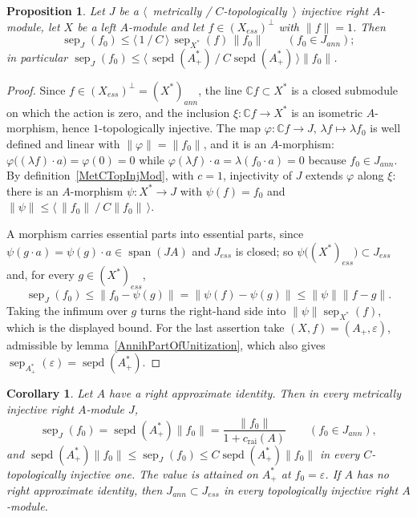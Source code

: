 \documentclass[11pt]{article}
\theoremstyle{plain}
\newtheorem{corollary}[theorem]{Corollary}
\newtheorem{proposition}[theorem]{Proposition}
\theoremstyle{definition}
\DeclareMathOperator{\sep}{sep}
\DeclareMathOperator{\sepd}{sepd}
\newcommand{\crai}{c_{\mathrm{rai}}}
\begin{document}
\begin{proposition}\label{SepOfAnnihVectorInInjMod}
Let $J$ be a $\langle$~metrically / $C$-topologically~$\rangle$ injective right
$A$-module, let $X$ be a left $A$-module and let $f\in{(X_{ess})}^\perp$ with
$\lVert f\rVert=1$. Then
\[
\sep_J(f_0)\leq\langle\,1\ /\ C\,\rangle\,\sep_{X^*}(f)\,\lVert f_0\rVert
\qquad(f_0\in J_{ann});
\]
in particular
$\sep_J(f_0)\leq\langle\,\sepd(A_+^*)\ /\ C\sepd(A_+^*)\,\rangle\lVert f_0\rVert$.
\end{proposition}

\begin{proof}
Since $f\in{(X_{ess})}^\perp={(X^*)}_{ann}$, the line
$\mathbb{C}f\subset X^*$ is a closed submodule on which the action is zero, and
the inclusion $\xi:\mathbb{C}f\to X^*$ is an isometric $A$-morphism, hence
$1$-topologically injective. The map
$\varphi:\mathbb{C}f\to J,\,\lambda f\mapsto\lambda f_0$ is well defined and
linear with $\lVert\varphi\rVert=\lVert f_0\rVert$, and it is an $A$-morphism:
$\varphi \bigl((\lambda f)\cdot a \bigr)=\varphi(0)=0$ while
$\varphi(\lambda f)\cdot a=\lambda(f_0\cdot a)=0$ because $f_0\in J_{ann}$. By
definition~\ref{MetCTopInjMod}, with $c=1$, injectivity of $J$ extends $\varphi$
along $\xi$: there is an $A$-morphism $\psi:X^*\to J$ with $\psi(f)=f_0$ and
$\lVert\psi\rVert\leq\langle\,\lVert f_0\rVert\ /\ C\lVert f_0\rVert\,\rangle$.

A morphism carries essential parts into essential parts, since
$\psi(g\cdot a)=\psi(g)\cdot a\in\operatorname{span}(JA)$ and $J_{ess}$ is
closed; so $\psi \bigl({(X^*)}_{ess} \bigr)\subset J_{ess}$ and, for every
$g\in{(X^*)}_{ess}$,
\[
\sep_J(f_0)\leq\lVert f_0-\psi(g)\rVert=\lVert\psi(f)-\psi(g)\rVert
\leq\lVert\psi\rVert\lVert f-g\rVert .
\]
Taking the infimum over $g$ turns the right-hand side into
$\lVert\psi\rVert\sep_{X^*}(f)$, which is the displayed bound. For the last
assertion take $(X,f)=(A_+,\varepsilon)$, admissible by
lemma~\ref{AnnihPartOfUnitization}, which also gives
$\sep_{A_+^*}(\varepsilon)=\sepd(A_+^*)$.
\end{proof}

\begin{corollary}\label{ExactSepOfAnnihVectorInInjMod}
Let $A$ have a right approximate identity. Then in every metrically injective
right $A$-module $J$,
\[
\sep_J(f_0)=\sepd(A_+^*)\lVert f_0\rVert=\frac{\lVert f_0\rVert}{1+\crai(A)}
\qquad(f_0\in J_{ann}),
\]
and $\sepd(A_+^*)\lVert f_0\rVert\leq\sep_J(f_0)
\leq C\sepd(A_+^*)\lVert f_0\rVert$ in every $C$-topologically injective one. The
value is attained on $A_+^*$ at $f_0=\varepsilon$. If $A$ has no right
approximate identity, then $J_{ann}\subset J_{ess}$ in every topologically
injective right $A$-module.
\end{corollary}
\end{document}
